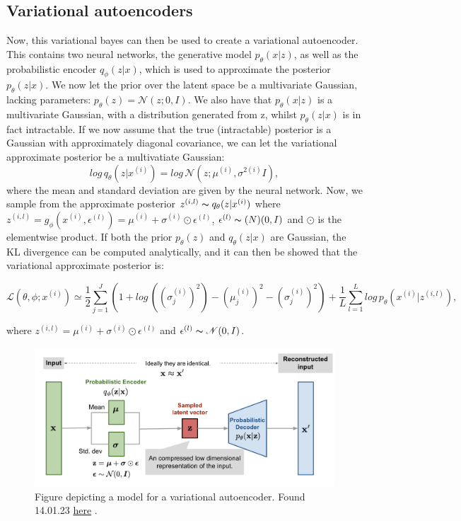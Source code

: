 \subsection*{Variational autoencoders}
Now, this variational bayes can then be used to create a variational autoencoder. This contains two neural networks, the generative model $p_{\theta}(x|z)$,
as well as the probabilistic encoder $q_{\phi}(z|x)$, which is used to approximate the posterior $p_{\theta}(z|x)$. We now let the prior over 
the latent space be a multivariate Gaussian, lacking parameters: $p_{\theta}(z) = \mathcal{N}(z;0,I)$. We also have that $p_{\theta}(x|z)$ is a multivariate Gaussian,
with a distribution generated from z, whilst $p_{\theta}(z|x)$ is in fact intractable. If we now assume that the true (intractable) posterior 
is a Gaussian with approximately diagonal covariance, we can let the variational approximate posterior be a multivatiate Gaussian:
\begin{equation}
    log\, q_{\theta}(z|x^{(i)}) = log\, \mathcal{N}(z;\mu^{(i)},\sigma^{2(i)}I),
\end{equation}
where the mean and standard deviation are given by the neural network. Now, we sample from the approximate posterior $z^{(i,l)} \thicksim q_{\theta}(z|x^{(i)})$
where $z^{(i,l)} = g_{\phi}(x^{(i)}, \epsilon^{(l)}) = \mu^{(i)} + \sigma^{(i)} \odot \epsilon^{(l)}$, $\epsilon^{(l)} \thicksim \mathcal(N)(0,I)$ and $\odot$
is the elementwise product. If both the prior $p_{\theta}(z)$ and $q_{\theta}(z|x)$ are Gaussian, the KL divergence can be computed analytically, and it 
can then be showed\cite{VAE} that the variational approximate posterior is:

\begin{equation}\label{eq:loss_vae}
    \mathcal{L}(\theta, \phi;x^{(i)}) \simeq \frac{1}{2}\sum_{j=1}^{J}(1 + log\, ((\sigma^{(i)}_{j})^2) - (\mu^{(i)}_{j})^2 - (\sigma^{(i)}_{j})^2) +\frac{1}{L}\sum_{l=1}^{L}log\, p_{\theta}(x^{(i)}|z^{(i,l)}),
\end{equation}

where $z^{(i,l)} = \mu^{(i)} + \sigma^{(i)} \odot \epsilon^{(l)}$ and $ \epsilon^{(l)} \thicksim \mathcal{N}(0,I)$. 




\begin{figure}[H]
    \includegraphics[width=\linewidth]{Figures/Machinelearning/vae-gaussian.png}
    \caption{Figure depicting a model for a variational autoencoder. Found 14.01.23 \href{https://lilianweng.github.io/posts/2018-08-12-vae/vae-gaussian.png}{here} \cite{weng2018VAE}. }
    \label{fig:vae}
\end{figure}

